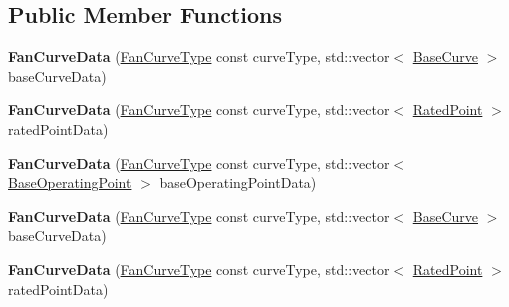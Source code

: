 \subsection*{Public Member Functions}
\begin{DoxyCompactItemize}
\item 
\mbox{\label{class_fan_curve_data_a2419372103465feb9dca675d5391c489}} 
{\bfseries Fan\+Curve\+Data} (\hyperlink{___c_pack___packages_2_darwin_2_s_t_g_z_2amo__tools__suite--_darwin-x86__64_2amo__tools__suite_2include_2fans_2_fan_curve_8h_a5c9bed68c43ea99f4baf31c4a4cdd0fa}{Fan\+Curve\+Type} const curve\+Type, std\+::vector$<$ \hyperlink{struct_fan_curve_data_1_1_base_curve}{Base\+Curve} $>$ base\+Curve\+Data)
\item 
\mbox{\label{class_fan_curve_data_aab50cc3aa6ac0208d02691af715d72bb}} 
{\bfseries Fan\+Curve\+Data} (\hyperlink{___c_pack___packages_2_darwin_2_s_t_g_z_2amo__tools__suite--_darwin-x86__64_2amo__tools__suite_2include_2fans_2_fan_curve_8h_a5c9bed68c43ea99f4baf31c4a4cdd0fa}{Fan\+Curve\+Type} const curve\+Type, std\+::vector$<$ \hyperlink{struct_fan_curve_data_1_1_rated_point}{Rated\+Point} $>$ rated\+Point\+Data)
\item 
\mbox{\label{class_fan_curve_data_a06a924f8d9b61eabc3fcaf2b32fc9bff}} 
{\bfseries Fan\+Curve\+Data} (\hyperlink{___c_pack___packages_2_darwin_2_s_t_g_z_2amo__tools__suite--_darwin-x86__64_2amo__tools__suite_2include_2fans_2_fan_curve_8h_a5c9bed68c43ea99f4baf31c4a4cdd0fa}{Fan\+Curve\+Type} const curve\+Type, std\+::vector$<$ \hyperlink{struct_fan_curve_data_1_1_base_operating_point}{Base\+Operating\+Point} $>$ base\+Operating\+Point\+Data)
\item 
\mbox{\label{class_fan_curve_data_a2419372103465feb9dca675d5391c489}} 
{\bfseries Fan\+Curve\+Data} (\hyperlink{___c_pack___packages_2_darwin_2_s_t_g_z_2amo__tools__suite--_darwin-x86__64_2amo__tools__suite_2include_2fans_2_fan_curve_8h_a5c9bed68c43ea99f4baf31c4a4cdd0fa}{Fan\+Curve\+Type} const curve\+Type, std\+::vector$<$ \hyperlink{struct_fan_curve_data_1_1_base_curve}{Base\+Curve} $>$ base\+Curve\+Data)
\item 
\mbox{\label{class_fan_curve_data_aab50cc3aa6ac0208d02691af715d72bb}} 
{\bfseries Fan\+Curve\+Data} (\hyperlink{___c_pack___packages_2_darwin_2_s_t_g_z_2amo__tools__suite--_darwin-x86__64_2amo__tools__suite_2include_2fans_2_fan_curve_8h_a5c9bed68c43ea99f4baf31c4a4cdd0fa}{Fan\+Curve\+Type} const curve\+Type, std\+::vector$<$ \hyperlink{struct_fan_curve_data_1_1_rated_point}{Rated\+Point} $>$ rated\+Point\+Data)

\end{DoxyCompactItemize}
